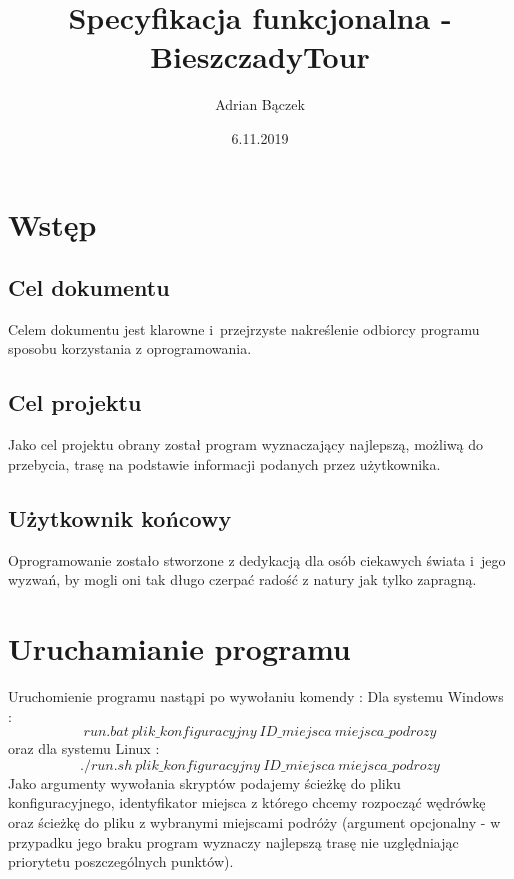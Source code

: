 \documentclass[10pt,oneside]{article}
\title{Specyfikacja funkcjonalna - BieszczadyTour}
\author{Adrian Bączek}
\date{6.11.2019}
\begin{document}
\maketitle


\thispagestyle{fancy}

\newpage


\section{Wstęp}
\subsection{Cel dokumentu}
Celem dokumentu jest klarowne i~przejrzyste nakreślenie 
odbiorcy programu sposobu korzystania z oprogramowania.
\subsection{Cel projektu}
Jako cel projektu obrany został program wyznaczający najlepszą, możliwą do przebycia, 
trasę na podstawie informacji podanych przez użytkownika.
\subsection{Użytkownik końcowy}
Oprogramowanie zostało stworzone z dedykacją dla osób ciekawych świata 
i~jego wyzwań, by mogli oni tak długo czerpać radość z natury jak tylko zapragną.

\section{Uruchamianie programu}
Uruchomienie programu nastąpi po wywołaniu komendy : 
\newline Dla systemu Windows : $$run.bat~plik\_konfiguracyjny~ID\_miejsca~miejsca\_podrozy$$ oraz dla systemu Linux :
$$./run.sh~plik\_konfiguracyjny~ID\_miejsca~miejsca\_podrozy$$
Jako argumenty wywołania skryptów podajemy ścieżkę do pliku konfiguracyjnego, identyfikator miejsca 
z którego chcemy rozpocząć wędrówkę oraz ścieżkę do pliku z wybranymi miejscami podróży (argument opcjonalny - w przypadku jego braku program wyznaczy najlepszą trasę nie uzględniając priorytetu poszczególnych punktów).
\end{document}
